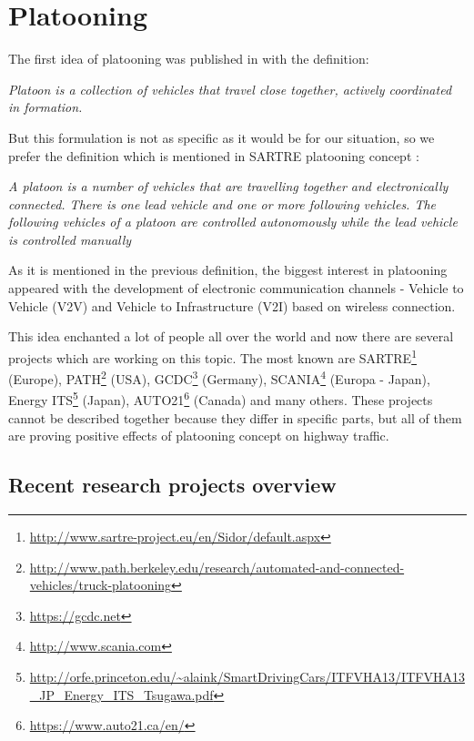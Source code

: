 \newtheorem{theorem}{Theorem}[section]
\newtheorem{corollary}{Corollary}
\chapter{Platooning}
The first idea of platooning was published in \cite{shladover1979} with the definition:

\textit{
\newline
Platoon is a collection of vehicles that travel close together, actively coordinated in formation.}
\newline

But this formulation is not as specific as it would be for our situation, so we prefer the definition which is mentioned in SARTRE platooning concept \cite{bergenhem2010challenges}:

\textit{
\newline
A platoon is a number of vehicles that are travelling together and electronically connected. There is one lead vehicle and one or more following vehicles. The following vehicles of a platoon are controlled autonomously while the lead vehicle is controlled manually}
\newline

As it is mentioned in the previous definition, the biggest interest in platooning appeared with the development of electronic communication channels - Vehicle to Vehicle (V2V) and Vehicle to Infrastructure (V2I) based on wireless connection.

This idea enchanted a lot of people all over the world and now there are several projects which are working on this topic. The most known are SARTRE\footnote{\url{http://www.sartre-project.eu/en/Sidor/default.aspx}}  (Europe), PATH\footnote{\url{http://www.path.berkeley.edu/research/automated-and-connected-vehicles/truck-platooning}}  (USA), GCDC\footnote{\url{https://gcdc.net}}  (Germany), SCANIA\footnote{\url{http://www.scania.com}}  (Europa - Japan), Energy ITS\footnote{\url{http://orfe.princeton.edu/~alaink/SmartDrivingCars/ITFVHA13/ITFVHA13_JP_Energy_ITS_Tsugawa.pdf}}  (Japan), AUTO21\footnote{\url{https://www.auto21.ca/en/}}  (Canada) and many others. These projects cannot be described together because they differ in specific parts, but all of them are proving positive effects of platooning concept on highway traffic.

\newpage
\section{Recent research projects overview}

